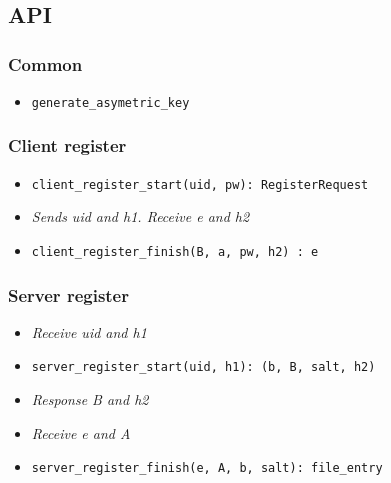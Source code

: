 \documentclass[../report.tex]{subfiles}
\begin{document}
\chapter{}
\section{API}
\subsection{Common}
\begin{itemize}
 \item \verb|generate_asymetric_key|
\end{itemize}


\subsection{Client register}
\begin{itemize}
 \item \verb|client_register_start(uid, pw): RegisterRequest|
 \item \emph{Sends uid and h1. Receive e and h2}
 \item \verb|client_register_finish(B, a, pw, h2) : e|
\end{itemize}


\subsection{Server register}
\begin{itemize}
 \item \emph{Receive uid and h1}
 \item \verb|server_register_start(uid, h1): (b, B, salt, h2)|
 \item \emph{Response B and h2}
 \item \emph{Receive e and A}
 \item \verb|server_register_finish(e, A, b, salt): file_entry|
\end{itemize}
\end{document}
